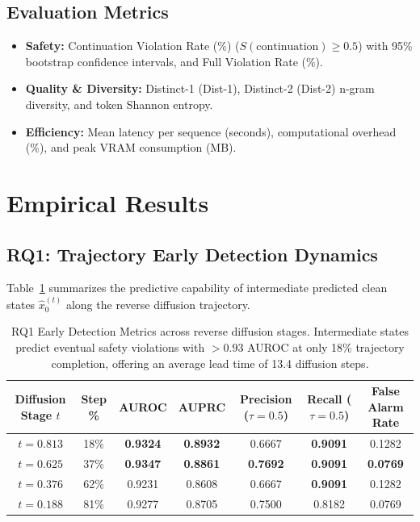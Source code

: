 \documentclass[11pt]{article}
\begin{document}
\subsection{Evaluation Metrics}
\begin{itemize}
    \item \textbf{Safety:} Continuation Violation Rate (\%) ($S(\text{continuation}) \ge 0.5$) with 95\% bootstrap confidence intervals, and Full Violation Rate (\%).
    \item \textbf{Quality \& Diversity:} Distinct-1 (Dist-1), Distinct-2 (Dist-2) n-gram diversity, and token Shannon entropy.
    \item \textbf{Efficiency:} Mean latency per sequence (seconds), computational overhead (\%), and peak VRAM consumption (MB).
\end{itemize}

\section{Empirical Results}

\subsection{RQ1: Trajectory Early Detection Dynamics}
Table~\ref{tab:rq1} summarizes the predictive capability of intermediate predicted clean states $\hat{x}_0^{(t)}$ along the reverse diffusion trajectory.

\begin{table}[h]
\centering
\small
\begin{tabular}{ccccccc}
\toprule
\textbf{Diffusion Stage $t$} & \textbf{Step \%} & \textbf{AUROC} & \textbf{AUPRC} & \textbf{Precision ($\tau=0.5$)} & \textbf{Recall ($\tau=0.5$)} & \textbf{False Alarm Rate} \\
\midrule
$t = 0.813$ & 18\% & \textbf{0.9324} & \textbf{0.8932} & 0.6667 & \textbf{0.9091} & 0.1282 \\
$t = 0.625$ & 37\% & \textbf{0.9347} & \textbf{0.8861} & \textbf{0.7692} & \textbf{0.9091} & \textbf{0.0769} \\
$t = 0.376$ & 62\% & 0.9231 & 0.8608 & 0.6667 & \textbf{0.9091} & 0.1282 \\
$t = 0.188$ & 81\% & 0.9277 & 0.8705 & 0.7500 & 0.8182 & 0.0769 \\
\bottomrule
\end{tabular}
\caption{RQ1 Early Detection Metrics across reverse diffusion stages. Intermediate states predict eventual safety violations with $>0.93$ AUROC at only 18\% trajectory completion, offering an average lead time of 13.4 diffusion steps.}
\label{tab:rq1}
\end{table}
\end{document}
